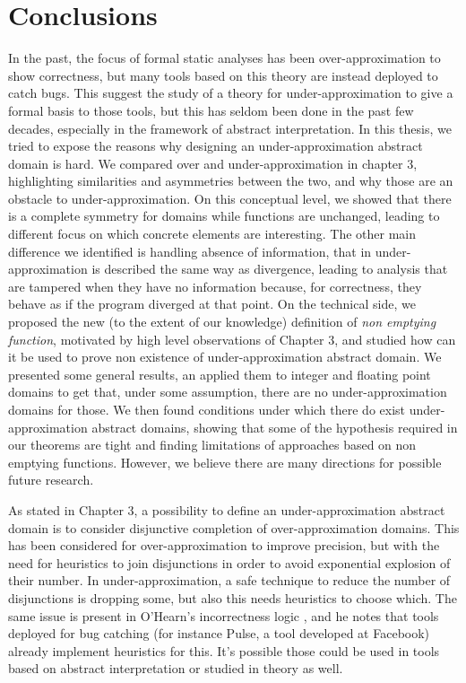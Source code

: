 \chapter{Conclusions}\label{ch:conclusions}
In the past, the focus of formal static analyses has been over-approximation to show correctness, but many tools based on this theory are instead deployed to catch bugs. This suggest the study of a theory for under-approximation to give a formal basis to those tools, but this has seldom been done in the past few decades, especially in the framework of abstract interpretation.
In this thesis, we tried to expose the reasons why designing an under-approximation abstract domain is hard. We compared over and under-approximation in chapter 3, highlighting similarities and asymmetries between the two, and why those are an obstacle to under-approximation. On this conceptual level, we showed that there is a complete symmetry for domains while functions are unchanged, leading to different focus on which concrete elements are interesting. The other main difference we identified is handling absence of information, that in under-approximation is described the same way as divergence, leading to analysis that are tampered when they have no information because, for correctness, they behave as if the program diverged at that point.
On the technical side, we proposed the new (to the extent of our knowledge) definition of \textit{non emptying function}, motivated by high level observations of Chapter 3, and studied how can it be used to prove non existence of under-approximation abstract domain. We presented some general results, an applied them to integer and floating point domains to get that, under some assumption, there are no under-approximation domains for those. We then found conditions under which there do exist under-approximation abstract domains, showing that some of the hypothesis required in our theorems are tight and finding limitations of approaches based on non emptying functions.
However, we believe there are many directions for possible future research.

As stated in Chapter 3, a possibility to define an under-approximation abstract domain is to consider disjunctive completion of over-approximation domains. This has been considered for over-approximation\cite{file-disjunctive-completion} to improve precision, but with the need for heuristics to join disjunctions in order to avoid exponential explosion of their number.
In under-approximation, a safe technique to reduce the number of disjunctions is dropping some, but also this needs heuristics to choose which. The same issue is present in O'Hearn's incorrectness logic \cite{ohearn-incorrectness-logic}, and he notes that tools deployed for bug catching (for instance Pulse, a tool developed at Facebook) already implement heuristics for this. It's possible those could be used in tools based on abstract interpretation or studied in theory as well.

